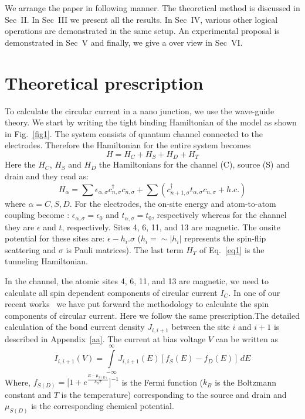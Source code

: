 \documentclass[prb,aps,twocolumn,amsmath,amssymb,floatfix,superscriptaddress]{revtex4}
\begin{document}
We arrange the paper in following manner. The theoretical method is discussed in Sec~II.
In Sec~III we present all the results.
In Sec~IV, various other logical operations are demonstrated in the same setup.
An experimental proposal is demonstrated in Sec~V and finally, we give a over view in
Sec~VI.

\section{Theoretical prescription}

To calculate the circular current in a nano junction, we use the wave-guide theory.
We start by writing the tight binding Hamiltonian of the model as shown in Fig.~\ref{fig1}.
The system consists of quantum channel connected to the electrodes. Therefore the Hamiltonian
for the entire system becomes
\begin{equation}
H= H_C + H_S + H_D + H_T
\label{eq1}
\end{equation}
Here the $H_C$, $H_S$ and $H_D$ the Hamiltonians for the channel (C),
source (S) and drain and they read as:
\begin{equation}
H_{\alpha}=\sum \epsilon_{\alpha,\sigma}c_{n,\sigma}^{\dagger}c_{n,\sigma} +
\sum\left(c_{n+1,\sigma}^{\dagger} t_{\alpha,\sigma} c_{n,\sigma} + h.c. \right)
\label{eq2}
\end{equation}
\noindent where $\alpha=C, S, D$. For the electrodes, the on-site energy and
atom-to-atom coupling become : $\epsilon_{\alpha,\sigma}=\epsilon_0$ and
$t_{\alpha,\sigma}=t_0$, respectively whereas for the channel they are
$\epsilon$ and $t$, respectively. Sites 4, 6, 11,
and 13 are magnetic. The onsite potential for these sites are:
$\epsilon - h_i.\sigma$ ($h_i = \sim |h_i|$ represents the spin-flip scattering
and $\sigma$ is Pauli matrices). The last term $H_T$ of Eq.~\ref{eq1}
is the tunneling Hamiltonian. 

In the channel, the atomic sites 4, 6, 11, and 13 are magnetic, we need to calculate
all spin dependent components of circular current $I_C$. In one of our recent
works~\cite{ref14} we have put forward the methodology to calculate the spin components of
circular current. Here we follow the same
prescription.The detailed calculation of the bond current density $J_{i,i+1}$ between
the site $i$ and $i+1$ is described in Appendix~\ref{aa}. The current at bias voltage $V$ can
be written as~\cite{ref16,ref17}
\begin{equation}
I_{i,i+1}(V) = \int\limits_{-\infty}^{\infty}J_{i,i+1}(E)[f_S(E) - f_D(E)]\, dE
\label{eq6}
\end{equation}
Where, $f_{S(D)}=\Big[1 + e^{\frac{E-\mu_{S(D)}}{k_B T}}\Big]^{-1}$ is
the Fermi function ($k_B$ is the Boltzmann constant and $T$ is the temperature)
corresponding to the source and drain and $\mu_{S(D)}$ is the corresponding
chemical potential.
\end{document}
